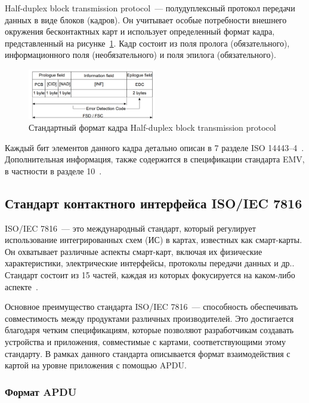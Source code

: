 Half-duplex block transmission protocol~--- полудуплексный протокол передачи данных в виде блоков (кадров).
Он учитывает особые потребности внешнего окружения бесконтактных карт и использует определенный формат кадра, представленный на рисунке~\ref{fig:hd_block_format}.
Кадр состоит из поля пролога (обязательного), информационного поля (необязательного) и поля эпилога (обязательного).

\begin{figure}[H]
    \centering
    \includegraphics[width=0.5\textwidth]{images/research/hd_block_format}
    \caption{\centering Стандартный формат кадра Half-duplex block transmission protocol}
    \label{fig:hd_block_format}
\end{figure}

Каждый бит элементов данного кадра детально описан в 7 разделе ISO 14443--4~\cite{iso14443-4}.
Дополнительная информация, также содержится в спецификации стандарта EMV, в частности в разделе 10~\cite{emv_specifications_book}.


\subsection{Стандарт контактного интерфейса ISO/IEC 7816}
\label{subsec:7816}

ISO/IEC 7816~--- это международный стандарт, который регулирует использование интегрированных схем (ИС) в картах, известных как смарт-карты.
Он охватывает различные аспекты смарт-карт, включая их физические характеристики, электрические интерфейсы, протоколы передачи данных и др..
Стандарт состоит из 15 частей, каждая из которых фокусируется на каком-либо аспекте~\cite{7816_wiki}.

Основное преимущество стандарта ISO/IEC 7816~--- способность обеспечивать совместимость между продуктами различных производителей.
Это достигается благодаря четким спецификациям, которые позволяют разработчикам создавать устройства и приложения, совместимые с картами, соответствующими этому стандарту.
В рамках данного стандарта описывается формат взаимодействия с картой на уровне приложения с помощью APDU.

\subsubsection{Формат APDU}

